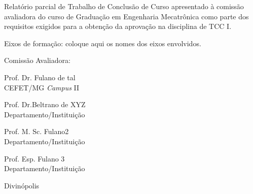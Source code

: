 \vspace*{2.25cm}

\begin{flushright}
\begin{minipage}{9.0cm}
Relatório parcial de Trabalho de Conclusão de Curso apresentado à
comissão avaliadora do curso de Graduação em Engenharia Mecatrônica
como  parte dos requisitos exigidos para a obtenção da aprovação
na disciplina de TCC I.

Eixos de formação: {coloque aqui os nomes dos eixos envolvidos}.

\vspace*{0.5cm}

\end{minipage}
\end{flushright}

\vspace*{2cm}

\noindent Comissão Avaliadora:
\vspace*{0.5cm}

\noindent \begin{minipage}{0.5\linewidth}
Prof. Dr. Fulano de tal \\[1mm]
CEFET/MG {\em Campus} II
\end{minipage}
\begin{minipage}{0.5\linewidth}
Prof. Dr.Beltrano de XYZ \\[1mm]
Departamento/Instituição
\end{minipage}

\vspace*{0.4cm}

\noindent \begin{minipage}{0.5\linewidth}
\noindent  Prof. M. Sc. Fulano2 \\[1mm]
\noindent  Departamento/Instituição
\end{minipage}
\begin{minipage}{0.5\linewidth}
Prof. Esp. Fulano 3\\[1mm]
Departamento/Instituição
\end{minipage}


\null \vfill

\begin{center}
Divinópolis \\\ano
\end{center}

\thispagestyle{empty}



